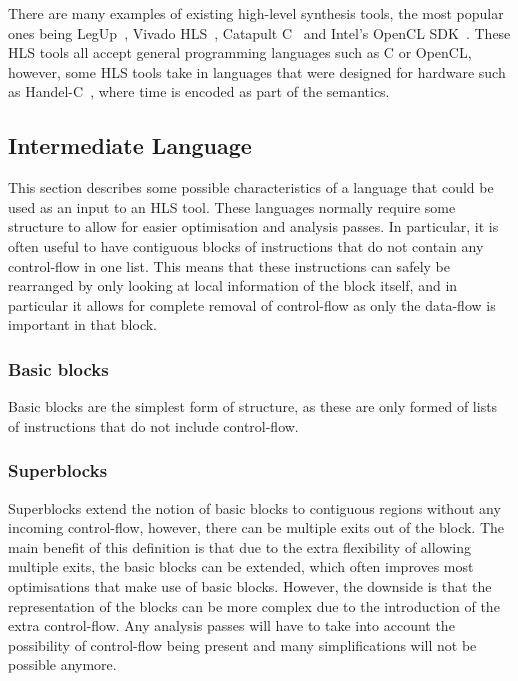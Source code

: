 There are many examples of existing high-level synthesis tools, the most popular ones being
LegUp~\cite{canis13_legup}, Vivado HLS~\cite{xilinx20_vivad_high_synth}, Catapult
C~\cite{mentor20_catap_high_level_synth} and Intel's OpenCL SDK~\cite{intel20_sdk_openc_applic}.
These HLS tools all accept general programming languages such as C or OpenCL, however, some HLS
tools take in languages that were designed for hardware such as
Handel-C~\cite{aubury96_handel_c_languag_refer_guide}, where time is encoded as part of the
semantics.

\subsection{Intermediate Language}%
\label{sec:language-blocks}

This section describes some possible characteristics of a language that could be used as an input to
an \gls{HLS} tool.  These languages normally require some structure to allow for easier optimisation and
analysis passes.  In particular, it is often useful to have contiguous blocks of instructions that
do not contain any control-flow in one list.  This means that these instructions can safely be
rearranged by only looking at local information of the block itself, and in particular it allows for
complete removal of control-flow as only the data-flow is important in that block.

\subsubsection{Basic blocks}


Basic blocks are the simplest form of structure, as these are only formed of lists of instructions
that do not include control-flow.

\subsubsection{Superblocks}

Superblocks extend the notion of basic blocks to contiguous regions without any incoming
control-flow, however, there can be multiple exits out of the block.  The main benefit of this
definition is that due to the extra flexibility of allowing multiple exits, the basic blocks can be
extended, which often improves most optimisations that make use of basic blocks.  However, the
downside is that the representation of the blocks can be more complex due to the introduction of the
extra control-flow.  Any analysis passes will have to take into account the possibility of
control-flow being present and many simplifications will not be possible anymore.

